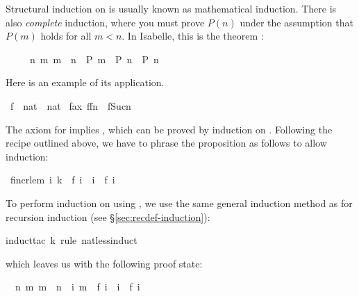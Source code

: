 \begin{isabellebody}
\begin{isamarkuptext}
Structural induction on  is
usually known as mathematical induction. There is also \emph{complete}
induction, where you must prove $P(n)$ under the assumption that $P(m)$
holds for all $m<n$. In Isabelle, this is the theorem :
\begin{isabelle}%
\ \ \ \ \ {\isacharparenleft}{\isasymAnd}n{\isachardot}\ {\isasymforall}m{\isachardot}\ m\ {\isacharless}\ n\ {\isasymlongrightarrow}\ P\ m\ {\isasymLongrightarrow}\ P\ n{\isacharparenright}\ {\isasymLongrightarrow}\ P\ n%
\end{isabelle}
Here is an example of its application.%
\end{isamarkuptext}%
\ f\ {\isacharcolon}{\isacharcolon}\ {\isachardoublequote}nat\ {\isasymRightarrow}\ nat{\isachardoublequote}\isanewline
{}\ f{\isacharunderscore}ax{\isacharcolon}\ {\isachardoublequote}f{\isacharparenleft}f{\isacharparenleft}n{\isacharparenright}{\isacharparenright}\ {\isacharless}\ f{\isacharparenleft}Suc{\isacharparenleft}n{\isacharparenright}{\isacharparenright}{\isachardoublequote}%
\begin{isamarkuptext}%
\noindent
The axiom for  implies , which can
be proved by induction on . Following the recipe outlined
above, we have to phrase the proposition as follows to allow induction:%
\end{isamarkuptext}%
\ f{\isacharunderscore}incr{\isacharunderscore}lem{\isacharcolon}\ {\isachardoublequote}{\isasymforall}i{\isachardot}\ k\ {\isacharequal}\ f\ i\ {\isasymlongrightarrow}\ i\ {\isasymle}\ f\ i{\isachardoublequote}%
\begin{isamarkuptxt}%
\noindent
To perform induction on  using , we use
the same general induction method as for recursion induction (see
\S\ref{sec:recdef-induction}):%
\end{isamarkuptxt}%
induct{\isacharunderscore}tac\ k\ rule{\isacharcolon}\ nat{\isacharunderscore}less{\isacharunderscore}induct{\isacharparenright}%
\begin{isamarkuptxt}%
\noindent
which leaves us with the following proof state:
\begin{isabelle}%
\ {}{\isachardot}\ {\isasymAnd}n{\isachardot}\ {\isasymforall}m{\isachardot}\ m\ {\isacharless}\ n\ {\isasymlongrightarrow}\ {\isacharparenleft}{\isasymforall}i{\isachardot}\ m\ {\isacharequal}\ f\ i\ {\isasymlongrightarrow}\ i\ {\isasymle}\ f\ i{\isacharparenright}\ {\isasymLongrightarrow}\isanewline

\end{isabelle}
\end{isamarkuptxt}
\end{isabellebody}

